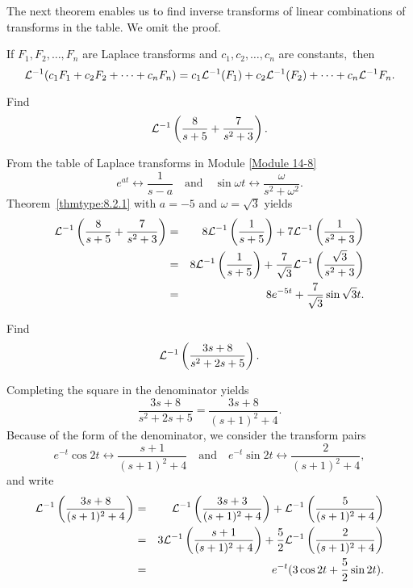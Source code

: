 \documentclass{ximera}
\begin{document}
The next theorem enables us to find inverse transforms of linear
combinations of transforms in the table. We omit the proof.

\begin{theorem}\label{thmtype:8.2.1}
If $F_1, F_2, \dots, F_n$ are Laplace transforms and
$c_1, c_2, \dots, c_n$ are constants$,$ then
$$
{\cal L}^{-1}(c_1F_1+c_2F_2+\cdots+c_nF_n)=c_1{\cal L}^{-1}(F_1)+c_2{\cal
L}^{-1}(F_2)+\cdots+c_n{\cal L}^{-1}F_n.
$$
\end{theorem}

\begin{example}\label{example:8.2.2} Find
$$
{\cal L}^{-1}\left(\frac{8}{s+5}+\frac{7}{s^2+3}\right).
$$


\begin{explanation}
From the table of Laplace transforms in Module \ref{Module 14-8} %
$$
e^{at}\leftrightarrow \frac{1}{s-a}\quad\mbox{and}\quad
\sin\omega t\leftrightarrow \frac{\omega}{s^2+\omega^2}.
$$
Theorem~\ref{thmtype:8.2.1}
with $a=-5$ and   $\omega=\sqrt3$
yields
\begin{eqnarray*}
{\cal L}^{-1}\left(\frac{8}{s+5}+\frac{7}{s^2+3}\right)&=&
8{\cal L}^{-1}\left(\frac{1}{s+5}\right)+7{\cal L}^{-1}\left(\frac{1}{s^2+3}\right)\\
&=&
8{\cal L}^{-1}\left(\frac{1}{s+5}\right)+\frac{7}{\sqrt3}{\cal
L}^{-1}\left(\frac{\sqrt3}{s^2+3}\right)\\&=&8e^{-5t}+\frac{7}{\sqrt3}\sin\sqrt3t.
\end{eqnarray*}
\end{explanation}
\end{example}

\begin{example}\label{example:8.2.3} Find
$$
{\cal L}^{-1}\left(\frac{3s+8}{s^2+2s+5}\right).
$$

\begin{explanation}
Completing the square in the denominator yields
$$
\frac{3s+8}{s^2+2s+5}=\frac{3s+8}{(s+1)^2+4}.
$$
Because of the form of the denominator, we consider
the transform pairs
$$
 e^{-t}\cos 2t\leftrightarrow\frac{s+1}{(s+1)^2+4}
\quad\mbox{and}\quad
 e^{-t}\sin 2t\leftrightarrow\frac{2}{(s+1)^2+4},
$$
and write
\begin{eqnarray*}
{\cal L}^{-1}\left(\frac{3s+8}{(s+1)^2+4}\right)&=&
{\cal L}^{-1}\left(\frac{3s+3}{(s+1)^2+4}\right)+
{\cal L}^{-1}\left(\frac{5}{(s+1)^2+4}\right)\\&=&
3{\cal L}^{-1}\left(\frac{s+1}{(s+1)^2+4}\right)+
\frac{5}{2}{\cal L}^{-1}\left(\frac{2}{(s+1)^2+4}\right)\\&=&
e^{-t}(3\cos 2t+\frac{5}{2}\sin 2t).
\end{eqnarray*}
\end{explanation}
\end{example}
\end{document}
